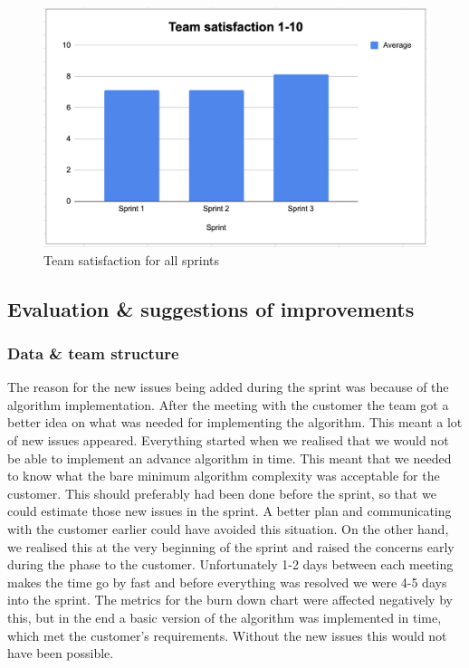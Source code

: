 \documentclass{article}
\begin{document}
\begin{figure}[H]
    \centering
    \includegraphics[scale=0.6]{pfrFigures/ToptalSatisfaction.png}
    \caption{Team satisfaction for all sprints}
    \label{fig:totalSatisfaction}
\end{figure}

\subsection{Evaluation \& suggestions of improvements}

\subsubsection{Data \& team structure}
The reason for the new issues being added during the sprint was because of the algorithm implementation. After the meeting with the customer the team got a better idea on what was needed for implementing the algorithm. This meant a lot of new issues appeared. Everything started when we realised that we would not be able to implement an advance algorithm in time. This meant that we needed to know what the bare minimum algorithm complexity was acceptable for the customer. This should preferably had been done before the sprint, so that we could estimate those new issues in the sprint. A better plan and communicating with the customer earlier could have avoided this situation. On the other hand, we realised this at the very beginning of the sprint and raised the concerns early during the phase to the customer. Unfortunately 1-2 days between each meeting makes the time go by fast and before everything was resolved we were 4-5 days into the sprint. The metrics for the burn down chart were affected negatively by this, but in the end a basic version of the algorithm was implemented in time, which met the customer's requirements. Without the new issues this would not have been possible.
\end{document}
